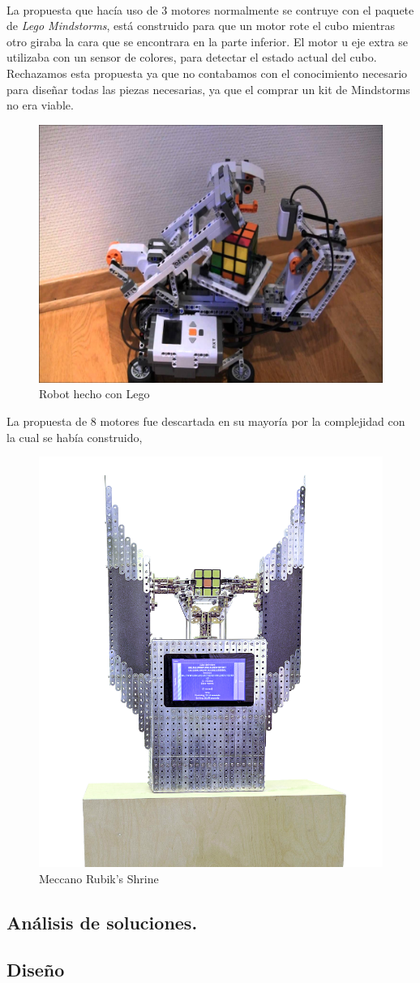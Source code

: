 \documentclass[12pt, letterpaper]{article}
\begin{document}
\paragraph{}
La propuesta que hacía uso de 3 motores normalmente se contruye con el paquete de \emph{Lego Mindstorms}, está construido para que un motor rote el cubo mientras otro giraba la cara que se encontrara en la parte inferior. El motor u eje extra se utilizaba con un sensor de colores, para detectar el estado actual del cubo. Rechazamos esta propuesta ya que no contabamos con el conocimiento necesario para diseñar todas las piezas necesarias, ya que el comprar un kit de Mindstorms no era viable.
\begin{figure}[hb]
	\centering
	\includegraphics[width=0.3\linewidth]{images/prop1.jpg}
	\caption{Robot hecho con Lego} \label{fig:prop1}
\end{figure}
La propuesta de 8 motores fue descartada en su mayoría por la complejidad con la cual se había construido,
\begin{figure}[hb]
	\centering
	\includegraphics[width=0.3\linewidth]{images/prop2.png}
	\caption{Meccano Rubik's Shrine} \label{fig:prop1}
\end{figure}
\paragraph{}

\subsection{Análisis de soluciones.}
\subsection{Diseño}
\end{document}
